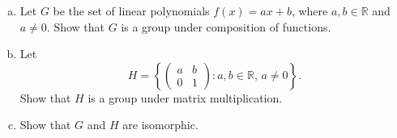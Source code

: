\documentclass[11pt]{scrartcl}
\providecommand{\RR}{\mathbb R}
\providecommand{\ii}{\item}
\begin{document}
\begin{problem}
    \begin{enumerate}[(a)]
        \ii Let $G$ be the set of linear polynomials $f(x) = ax+b$,
	where $a,b\in\RR$ and $a\ne0$. Show that $G$ is a group
	under composition of functions.
	\ii Let
	\begin{equation*}
	    H = \left\{ \begin{pmatrix}
		    a&b\\0&1
	    \end{pmatrix} : a,b\in\RR,\, a\ne 0\right\}.
	\end{equation*}
	Show that $H$ is a group under matrix multiplication.
	\ii Show that $G$ and $H$ are isomorphic.
    \end{enumerate}
\end{problem}
\end{document}
